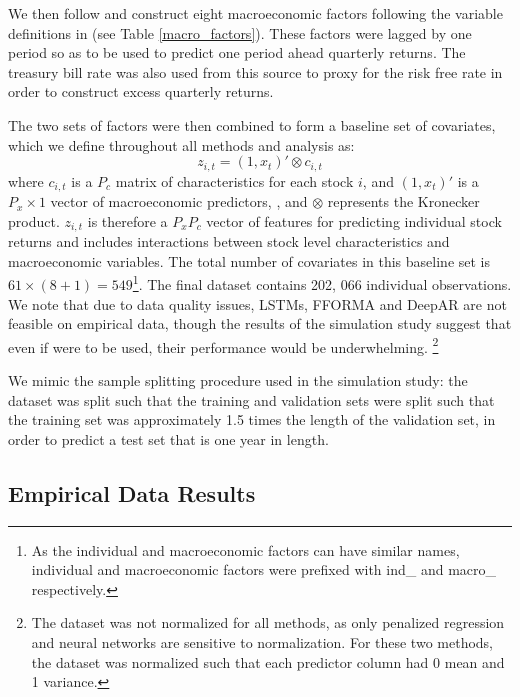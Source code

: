 \documentclass{article}
\begin{document}
We then follow \cite{gu_empirical_2018} and construct eight macroeconomic factors following the variable definitions in \cite{welch_comprehensive_2008} (see Table \ref{macro_factors}). These factors were lagged by one period so as to be used to predict one period ahead quarterly returns. The treasury bill rate was also used from this source to proxy for the risk free rate in order to construct excess quarterly returns. 

The two sets of factors were then combined to form a baseline set of covariates, which we define throughout all methods and analysis as:
\begin{equation}
z_{i,t} = (1, x_t)' \otimes c_{i, t}
\end{equation}
where $c_{i,t}$ is a $P_c$ matrix of characteristics for each stock $i$, and $(1, x_t)'$ is a $P_x \times 1$ vector of macroeconomic predictors, , and $\otimes$ represents the Kronecker product. $z_{i,t}$ is therefore a $P_x P_c$ vector of features for predicting individual stock returns and includes interactions between stock level characteristics and macroeconomic variables. The total number of covariates in this baseline set is $61 \times (8 + 1) = 549$\footnote{As the individual and macroeconomic factors can have similar names, individual and macroeconomic factors were prefixed with ind\_ and macro\_ respectively.}. The final dataset contains 202, 066 individual observations. We note that due to data quality issues, LSTMs, FFORMA and DeepAR are not feasible on empirical data, though the results of the simulation study suggest that even if were to be used, their performance would be underwhelming. \footnote{The dataset was not normalized for all methods, as only penalized regression and neural networks are sensitive to normalization. For these two methods, the dataset was normalized such that each predictor column had 0 mean and 1 variance.}

We mimic the sample splitting procedure used in the simulation study: the dataset was split such that the training and validation sets were split such that the training set was approximately 1.5 times the length of the validation set, in order to predict a test set that is one year in length.

\subsection{Empirical Data Results}

\end{document}
